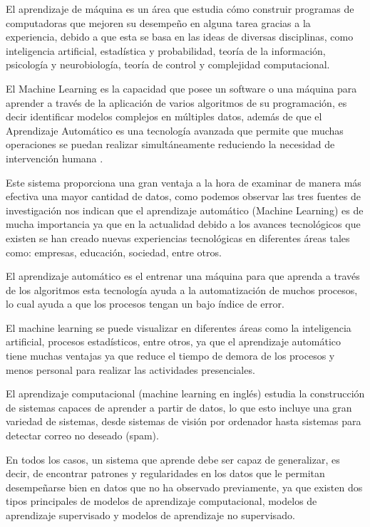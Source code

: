 El aprendizaje de máquina es un área que estudia cómo construir programas de computadoras que mejoren su desempeño en alguna tarea gracias a la experiencia, debido a que esta se basa en las ideas de diversas disciplinas, como inteligencia artificial, estadística y probabilidad, teoría de la información, psicología y neurobiología, teoría de control y complejidad computacional.

El Machine Learning es la capacidad que posee un software o una máquina para aprender a través de la aplicación de varios algoritmos de su programación, es decir identificar modelos complejos en múltiples datos, además de que el Aprendizaje Automático es una tecnología avanzada que permite que muchas operaciones se puedan realizar simultáneamente reduciendo la necesidad de intervención humana \cite{CornejoMacias2021}.

Este sistema proporciona una gran ventaja a la hora de examinar de manera más efectiva una mayor cantidad de datos, como podemos observar las tres fuentes de investigación nos indican que el aprendizaje automático (Machine Learning) es de mucha importancia ya que en la actualidad debido a los avances tecnológicos que existen se han creado nuevas experiencias tecnológicas en diferentes áreas tales como: empresas, educación, sociedad, entre otros. 

El aprendizaje automático es el entrenar una máquina para que aprenda a través de los algoritmos esta tecnología ayuda a la automatización de muchos procesos, lo cual ayuda a que los procesos tengan un bajo índice de error. 

El machine learning se puede visualizar en diferentes áreas como la inteligencia artificial, procesos estadísticos, entre otros, ya que el aprendizaje automático tiene muchas ventajas ya que reduce el tiempo de demora de los procesos y menos personal para realizar las actividades presenciales.

El aprendizaje computacional (machine learning en inglés) estudia la construcción de sistemas capaces de aprender a partir de datos, lo que esto incluye una gran variedad de sistemas, desde sistemas de visión por ordenador hasta sistemas para detectar correo no deseado (spam). 

En todos los casos, un sistema que aprende debe ser capaz de generalizar, es decir, de encontrar patrones y regularidades en los datos que le permitan desempeñarse bien en datos que no ha observado previamente, ya que existen dos tipos principales de modelos de aprendizaje computacional, modelos de aprendizaje supervisado y modelos de aprendizaje no supervisado. 

